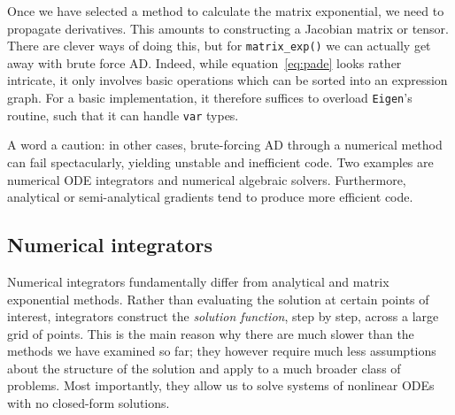 \documentclass[11pt]{article}
\begin{document}
Once we have selected a method to calculate the matrix exponential,
we need to propagate derivatives. This amounts to constructing a Jacobian matrix or tensor.
There are clever ways of doing this, but for \texttt{matrix\_exp()} we can actually get away
with brute force AD.
Indeed, while equation~\ref{eq:pade} looks rather intricate, it only involves basic operations
which can be sorted into an expression graph.
For a basic implementation, it therefore suffices to overload \texttt{Eigen}'s routine, such that
it can handle \texttt{var} types.

A word a caution: in other cases, brute-forcing AD through a numerical method can
fail spectacularly, yielding unstable and inefficient code.
Two examples are numerical ODE integrators and numerical algebraic solvers.
Furthermore, analytical or semi-analytical gradients tend to produce more efficient code.

%
%

\subsection{Numerical integrators}

Numerical integrators fundamentally differ from analytical and matrix exponential methods.
Rather than evaluating the solution at certain points of interest,
integrators construct the \textit{solution function}, step by step, across a large grid of points.
This is the main reason why there are much slower than the methods we have examined so far;
they however require much less assumptions about the structure of the solution and apply to a much
broader class of problems. Most importantly, they allow us to solve systems of nonlinear ODEs with
no closed-form solutions.
\end{document}
